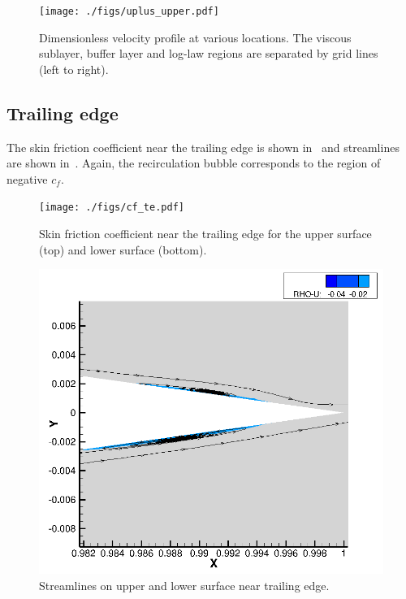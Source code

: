 \begin{figure}
    \centering
    \texttt{[image: ./figs/uplus\_upper.pdf]}
    \caption{Dimensionless velocity profile at various locations. The viscous sublayer, buffer layer and
        log-law regions are separated by grid lines (left to right).}
    \label{fig:uplus}
\end{figure}

\subsection{Trailing edge}
The skin friction coefficient near the trailing edge is shown in~ and streamlines are shown
in~. Again, the recirculation bubble corresponds to the region of negative
$c_f$.

\begin{figure}[H]
    \centering
    \texttt{[image: ./figs/cf\_te.pdf]}
    \caption{Skin friction coefficient near the trailing edge for the upper surface (top) and
        lower surface (bottom).}\label{fig:cf_te}
\end{figure}

\begin{figure}
    \centering
    \includegraphics[width=1.0\textwidth]{./figs/recirculation_te.png}
    \caption{Streamlines on upper and lower surface near trailing edge.}\label{fig:recirculation_te}
\end{figure}


